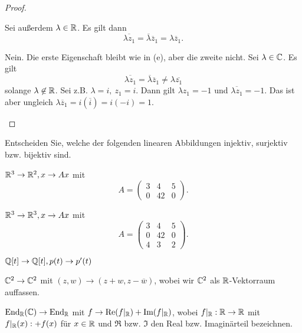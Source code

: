 \begin{proof}
\begin{parts}
		Sei außerdem $\lambda\in \mathbb{R}$. Es gilt dann
		\[
		\overline{\lambda z_1}=\overline{\lambda}\overline{z}_1=\lambda \overline{z}_1
		.\] 
	\item Nein. Die erste Eigenschaft bleibt wie in (e), aber die zweite nicht. Sei $\lambda\in \mathbb{C}$. Es gilt
		\[
		\overline{\lambda z_1}=\overline{\lambda}\overline{z}_1\neq \lambda \overline{z_1}
	\]
	solange $\lambda \not\in \mathbb{R}$. Sei z.B. $\lambda=i,~z_1=i$. Dann gilt $\lambda z_1=-1$ und $\overline{\lambda z_1}=-1$. Das ist aber ungleich $\lambda \overline{z}_1=i(\overline{i})=i(-i)=1$.
	\end{parts}
\end{proof}

\begin{Problem}
Entscheiden Sie, welche der folgenden linearen Abbildungen injektiv, surjektiv bzw. bijektiv sind.
\begin{parts}
\item $\mathbb{R}^3\to \mathbb{R}^2,x\to Ax$ mit
	\[
		A=\begin{pmatrix} 3 & 4 & 5\\0 & 42 & 0 \end{pmatrix} 
	.\] 
\item $\mathbb{R}^3\to \mathbb{R}^3,x\to Ax$ mit
	\[
		A=\begin{pmatrix} 3 & 4 & 5 \\ 0 & 42 & 0 \\ 4 & 3 & 2 \end{pmatrix} 
	.\] 
\item $\mathbb{Q}[t]\to \mathbb{Q}[t],p(t)\to p'(t)$
\item $\mathbb{C}^2\to \mathbb{C}^2$ mit $(z,w)\to (z+w,z-\overline{w})$, wobei wir $\mathbb{C}^2$ als $\mathbb{R}$-Vektorraum auffassen.
\item $\text{End}_{\mathbb{R}}(\mathbb{C})\to\text{End}_{\mathbb{R}}$ mit $f\to \text{Re}(f|_{\mathbb{R}})+\text{Im}(f|_{\mathbb{R}})$, wobei $f|_{\mathbb{R}}:\mathbb{R}\to \mathbb{R}$ mit $f|_{\mathbb{R}}(x):+f(x)$ f\"{u}r $x\in \mathbb{R}$ und $\Re$ bzw. $\Im$ den Real bzw. Imaginärteil bezeichnen.
\end{parts}
\end{Problem}
